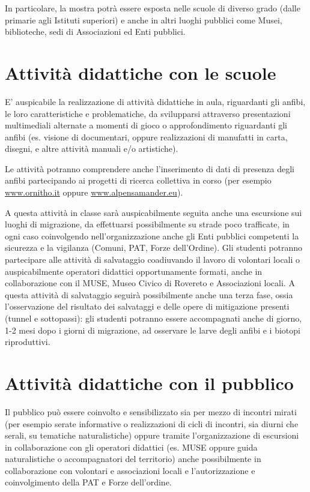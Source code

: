 \documentclass[11pt,a4paper,twoside]{memoir}
\begin{document}
In particolare, la mostra potrà essere esposta nelle scuole di diverso grado (dalle primarie agli Istituti superiori) e anche in altri luoghi pubblici come Musei, biblioteche, sedi di Associazioni ed Enti pubblici.

\section{Attività didattiche con le scuole}
E' auspicabile la realizzazione di attività didattiche in aula, riguardanti gli anfibi, le loro caratteristiche e problematiche, da svilupparsi attraverso presentazioni multimediali alternate a momenti di gioco o approfondimento riguardanti gli anfibi (es. visione di documentari, oppure realizzazioni di manufatti in carta, disegni, e altre attività manuali e/o artistiche).

Le attività potranno comprendere anche l'inserimento di dati di presenza degli anfibi partecipando ai progetti di ricerca collettiva in corso (per esempio \url{www.ornitho.it} oppure \url{www.alpensamander.eu}).

A questa attività in classe sarà auspicabilmente seguita anche una escursione sui luoghi di migrazione, da effettuarsi possibilmente su strade poco trafficate, in ogni caso coinvolgendo nell'organizzazione anche gli Enti pubblici competenti la sicurezza e la vigilanza (Comuni, PAT, Forze dell'Ordine).
Gli studenti potranno partecipare alle attività di salvataggio coadiuvando il lavoro di volontari locali o auspicabilmente operatori didattici opportunamente formati, anche in collaborazione con il MUSE, Museo Civico di Rovereto e Associazioni locali.
A questa attività di salvataggio seguirà possibilmente anche una terza fase, ossia l'osservazione del risultato dei salvataggi e delle opere di mitigazione presenti (tunnel e sottopassi): gli studenti potranno essere accompagnati anche di giorno, 1-2 mesi dopo i giorni di migrazione, ad osservare le larve degli anfibi e i biotopi riproduttivi.

\section{Attività didattiche con il pubblico}
Il pubblico può essere coinvolto e sensibilizzato sia per mezzo di incontri mirati (per esempio serate informative o realizzazioni di cicli di incontri, sia diurni che serali, su tematiche naturalistiche) oppure tramite l'organizzazione di escursioni in collaborazione con gli operatori didattici (es. MUSE oppure guida naturalistiche o accompagnatori del territorio) anche possibilmente in collaborazione con volontari e associazioni locali e l'autorizzazione e coinvolgimento della PAT e Forze dell'ordine.
\end{document}
